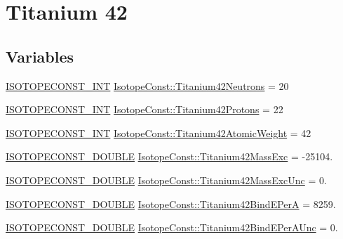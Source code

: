 \hypertarget{group___isotope_const-_titanium-_ti42}{}\section{Titanium 42}
\label{group___isotope_const-_titanium-_ti42}
\subsection*{Variables}
\begin{DoxyCompactItemize}
\item 
\mbox{\hyperlink{group___isotope_const-_macros_ga5f18360b3e99483a35c32d789e62621c}{I\+S\+O\+T\+O\+P\+E\+C\+O\+N\+S\+T\+\_\+\+I\+NT}} \mbox{\hyperlink{group___isotope_const-_titanium-_ti42_gad916e51dc7d781ff573ad4b2cfdb52b5}{Isotope\+Const\+::\+Titanium42\+Neutrons}} = 20
\item 
\mbox{\hyperlink{group___isotope_const-_macros_ga5f18360b3e99483a35c32d789e62621c}{I\+S\+O\+T\+O\+P\+E\+C\+O\+N\+S\+T\+\_\+\+I\+NT}} \mbox{\hyperlink{group___isotope_const-_titanium-_ti42_gad2460c31ad63e87554f0a25dd921e403}{Isotope\+Const\+::\+Titanium42\+Protons}} = 22
\item 
\mbox{\hyperlink{group___isotope_const-_macros_ga5f18360b3e99483a35c32d789e62621c}{I\+S\+O\+T\+O\+P\+E\+C\+O\+N\+S\+T\+\_\+\+I\+NT}} \mbox{\hyperlink{group___isotope_const-_titanium-_ti42_ga7730111b778d1e9cf87dbdc23aae8c37}{Isotope\+Const\+::\+Titanium42\+Atomic\+Weight}} = 42
\item 
\mbox{\hyperlink{group___isotope_const-_macros_ga8f45a7272ce02c0b4c65c44636ed719a}{I\+S\+O\+T\+O\+P\+E\+C\+O\+N\+S\+T\+\_\+\+D\+O\+U\+B\+LE}} \mbox{\hyperlink{group___isotope_const-_titanium-_ti42_ga66ccd4264edc8a3109d5127057fa597f}{Isotope\+Const\+::\+Titanium42\+Mass\+Exc}} = -\/25104.
\item 
\mbox{\hyperlink{group___isotope_const-_macros_ga8f45a7272ce02c0b4c65c44636ed719a}{I\+S\+O\+T\+O\+P\+E\+C\+O\+N\+S\+T\+\_\+\+D\+O\+U\+B\+LE}} \mbox{\hyperlink{group___isotope_const-_titanium-_ti42_ga75c9084ff4f020548cc53b8bda52c4d2}{Isotope\+Const\+::\+Titanium42\+Mass\+Exc\+Unc}} = 0.
\item 
\mbox{\hyperlink{group___isotope_const-_macros_ga8f45a7272ce02c0b4c65c44636ed719a}{I\+S\+O\+T\+O\+P\+E\+C\+O\+N\+S\+T\+\_\+\+D\+O\+U\+B\+LE}} \mbox{\hyperlink{group___isotope_const-_titanium-_ti42_ga32d492fbf45f11d641767134fdb5e7c3}{Isotope\+Const\+::\+Titanium42\+Bind\+E\+PerA}} = 8259.
\item 
\mbox{\hyperlink{group___isotope_const-_macros_ga8f45a7272ce02c0b4c65c44636ed719a}{I\+S\+O\+T\+O\+P\+E\+C\+O\+N\+S\+T\+\_\+\+D\+O\+U\+B\+LE}} \mbox{\hyperlink{group___isotope_const-_titanium-_ti42_ga770acaf172c6bc3d6af5cca698ff98b2}{Isotope\+Const\+::\+Titanium42\+Bind\+E\+Per\+A\+Unc}} = 0.

\end{DoxyCompactItemize}
